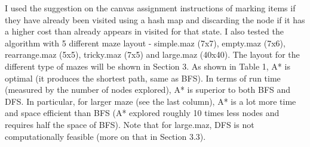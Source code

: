 \documentclass[9.5pt]{extarticle}
\begin{document}
I used the suggestion on the canvas assignment instructions of marking items if they have already been visited using a hash map and discarding the node if it has a higher cost than already appears in visited for that state. I also tested the algorithm with 5 different maze layout  - simple.maz (7x7), empty.maz (7x6), rearrange.maz (5x5), tricky.maz (7x5) and large.maz (40x40). The layout for the different type of mazes will be shown in Section 3. As shown in Table 1, A*  is optimal (it produces the shortest path, same as BFS). In terms of run time (measured by the number of nodes explored), A* is superior to both BFS and DFS. In particular, for larger maze (see the last column), A* is a lot more time and space efficient than BFS (A* explored roughly 10 times less nodes and requires half the space of BFS). Note that for large.maz, DFS is not computationally feasible (more on that in Section 3.3).
\end{document}
